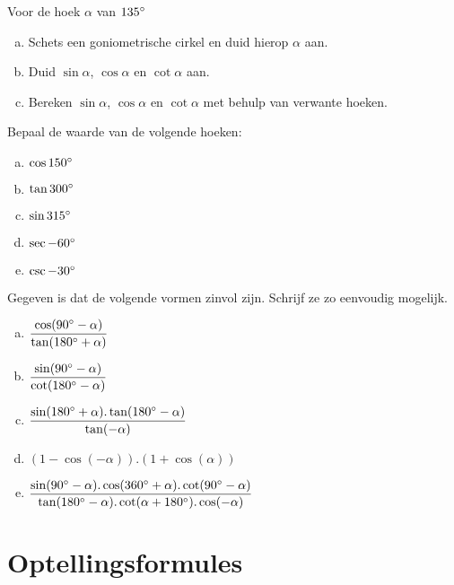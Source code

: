 \documentclass[a4paper,12pt]{article}
\begin{document}
\begin{oefening}
Voor de hoek $\alpha$ van $135^\circ$
\begin{enumerate}[(a)]
  \item Schets een goniometrische cirkel en duid hierop $\alpha$ aan.
  \item Duid $\sin \alpha$, $\cos \alpha$ en $\cot \alpha$ aan.
  \item Bereken $\sin \alpha$, $\cos \alpha$ en $\cot \alpha$ met behulp van verwante hoeken.
\end{enumerate}
\end{oefening}

\begin{oefening}
Bepaal de waarde van de volgende hoeken:
\begin{multicols}{3}
\begin{enumerate}[(a)]
  \itemsep.5em
  \item $\cos 150^\circ$
  \item $\tan 300^\circ$
  \item $\sin 315^\circ$
  \item $\sec -60^\circ$
  \item $\csc -30^\circ$
\end{enumerate}
\end{multicols}
\end{oefening}

\begin{oefening}
Gegeven is dat de volgende vormen zinvol zijn. Schrijf ze zo eenvoudig mogelijk.
\begin{enumerate}[(a)]
  \itemsep1em
  \item $\dfrac{\cos(90^\circ-\alpha)}{\tan(180^\circ+\alpha)}$
  \item $\dfrac{\sin(90^\circ-\alpha)}{\cot(180^\circ-\alpha)}$
  \item $\dfrac{\sin(180^\circ+\alpha).\tan(180^\circ-\alpha)}{\tan(-\alpha)}$
  \item $(1-\cos(-\alpha)).(1+\cos(\alpha))$
  \item $\dfrac{\sin(90^\circ-\alpha).\cos(360^\circ+\alpha).\cot(90^\circ-\alpha)}{\tan(180^\circ-\alpha).\cot(\alpha+180^\circ).\cos(-\alpha)}$
\end{enumerate}
\end{oefening}

\pagebreak
\section{Optellingsformules}
\end{document}
